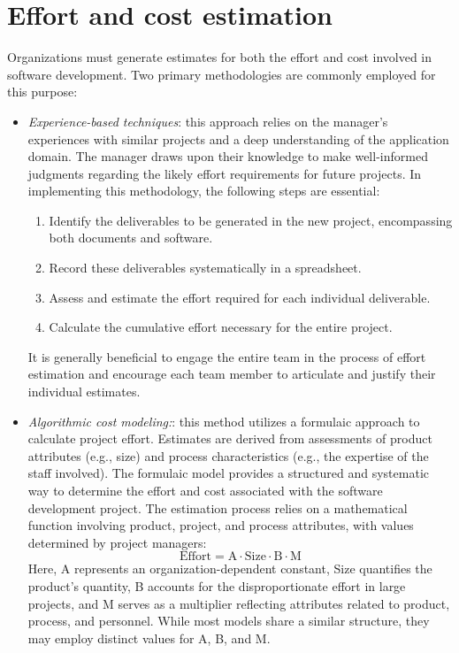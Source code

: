 \section{Effort and cost estimation}

Organizations must generate estimates for both the effort and cost involved in software development. 
Two primary methodologies are commonly employed for this purpose:
\begin{itemize}
    \item \textit{Experience-based techniques}: this approach relies on the manager's experiences with similar projects and a deep understanding of the application domain.
        The manager draws upon their knowledge to make well-informed judgments regarding the likely effort requirements for future projects.
        In implementing this methodology, the following steps are essential:
        \begin{enumerate}
            \item Identify the deliverables to be generated in the new project, encompassing both documents and software.
            \item Record these deliverables systematically in a spreadsheet.
            \item Assess and estimate the effort required for each individual deliverable.
            \item Calculate the cumulative effort necessary for the entire project.
        \end{enumerate}
        It is generally beneficial to engage the entire team in the process of effort estimation and encourage each team member to articulate and justify their individual estimates.
    \item \textit{Algorithmic cost modeling:}: this method utilizes a formulaic approach to calculate project effort.
        Estimates are derived from assessments of product attributes (e.g., size) and process characteristics (e.g., the expertise of the staff involved).
        The formulaic model provides a structured and systematic way to determine the effort and cost associated with the software development project.
        The estimation process relies on a mathematical function involving product, project, and process attributes, with values determined by project managers:
        \[\text{Effort}=\text{A}\cdot\text{Size}\cdot\text{B}\cdot\text{M}\]
        Here, A represents an organization-dependent constant, Size quantifies the product's quantity, B accounts for the disproportionate effort in large projects, and M serves as a multiplier reflecting attributes related to product, process, and personnel.
        While most models share a similar structure, they may employ distinct values for A, B, and M.
\end{itemize}

